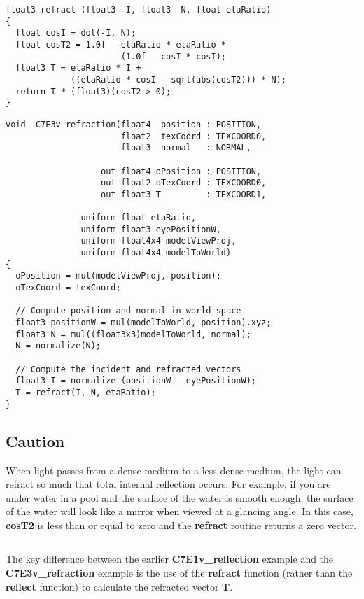 \documentclass[../main.tex]{subfiles}
\begin{document}
\FloatBarrier
\begin{lstlisting}
float3 refract (float3  I, float3  N, float etaRatio)
{
  float cosI = dot(-I, N);
  float cosT2 = 1.0f - etaRatio * etaRatio *
                       (1.0f - cosI * cosI);
  float3 T = etaRatio * I +
             ((etaRatio * cosI - sqrt(abs(cosT2))) * N);
  return T * (float3)(cosT2 > 0);
}
\end{lstlisting}
\FloatBarrier

\FloatBarrier
\begin{lstlisting}[caption=Example 7-3. The \textbf{C7E3v_refraction} Vertex Program]
void  C7E3v_refraction(float4  position : POSITION,
                       float2  texCoord : TEXCOORD0,
                       float3  normal   : NORMAL,

                   out float4 oPosition : POSITION,
                   out float2 oTexCoord : TEXCOORD0,
                   out float3 T         : TEXCOORD1,

               uniform float etaRatio,
               uniform float3 eyePositionW,
               uniform float4x4 modelViewProj,
               uniform float4x4 modelToWorld)
{
  oPosition = mul(modelViewProj, position);
  oTexCoord = texCoord;

  // Compute position and normal in world space
  float3 positionW = mul(modelToWorld, position).xyz;
  float3 N = mul((float3x3)modelToWorld, normal);
  N = normalize(N);

  // Compute the incident and refracted vectors
  float3 I = normalize (positionW - eyePositionW);
  T = refract(I, N, etaRatio);
}
\end{lstlisting}
\FloatBarrier

\subsection*{Caution}

When light passes from a dense medium to a less dense medium, the light can refract so much that total internal reflection occurs. For example, if you are under water in a pool and the surface of the water is smooth enough, the surface of the water will look like a mirror when viewed at a glancing angle. In this case, \textbf{cosT2} is less than or equal to zero and the \textbf{refract} routine returns a zero vector.
\hrule

The key difference between the earlier \textbf{C7E1v_reflection} example and the \textbf{C7E3v_refraction} example is the use of the \textbf{refract} function (rather than the \textbf{reflect} function) to calculate the refracted vector \textbf{T}. 
\end{document}
